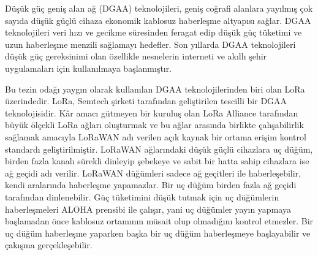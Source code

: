 Düşük güç geniş alan ağ (DGAA) teknolojileri, geniş coğrafi alanlara yayılmış çok sayıda düşük güçlü cihaza ekonomik kablosuz haberleşme altyapısı sağlar. DGAA teknolojileri veri hızı ve gecikme süresinden feragat edip düşük güç tüketimi ve uzun haberleşme menzili sağlamayı hedefler. Son yıllarda DGAA teknolojileri düşük güç gereksinimi olan özellikle nesnelerin interneti ve akıllı şehir uygulamaları için kullanılmaya başlanmıştır.

Bu tezin odağı yaygın olarak kullanılan DGAA teknolojilerinden biri olan LoRa üzerindedir. LoRa, Semtech şirketi tarafından geliştirilen tescilli bir DGAA teknolojisidir. Kâr amacı gütmeyen bir kuruluş olan LoRa Alliance tarafından büyük ölçekli LoRa ağları oluşturmak ve bu ağlar arasında birlikte çalışabilirlik sağlamak amacıyla LoRaWAN adı verilen açık kaynak bir ortama erişim kontrol standardı geliştirilmiştir. LoRaWAN ağlarındaki düşük güçlü cihazlara uç düğüm, birden fazla kanalı sürekli dinleyip şebekeye ve sabit bir hatta sahip cihazlara ise ağ geçidi adı verilir. LoRaWAN düğümleri sadece ağ geçitleri ile haberleşebilir, kendi aralarında haberleşme yapamazlar. Bir uç düğüm birden fazla ağ geçidi tarafından dinlenebilir. Güç tüketimini düşük tutmak için uç düğümlerin haberleşmeleri ALOHA prensibi ile çalışır, yani uç düğümler yayın yapmaya başlamadan önce kablosuz ortamının müsait olup olmadığını kontrol etmezler. Bir uç düğüm haberleşme yaparken başka bir uç düğüm haberleşmeye başlayabilir ve çakışma gerçekleşebilir.

